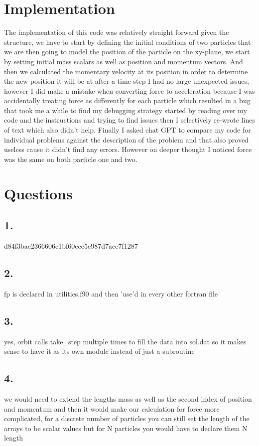 \documentclass{article}
\begin{document}
    \section*{Implementation}
        The implementation of this code was relatively straight forward given the structure, 
        we have to start by defining the initial conditions of two particles that we are then 
        going to model the position of the particle on the xy-plane, we start by setting initial
        mass scalars as well as position and momentum vectors. And then we calculated the momentary
        velocity at its position in order to determine the new position it will be at after a time step
        I had no large unexpected issues, however I did make a mistake when converting force to acceleration
        because I was accidentally treating force as differently for each particle which resulted in a bug that took me a while to find
        my debugging strategy started by reading over my code and the instructions and trying to find issues 
        then I selectively re-wrote lines of text which also didn't help, Finally I asked chat GPT to compare my code
        for individual problems against the description of the problem and that also proved useless cause it didn't find
        any errors. However on deeper thought I noticed force was the same on both particle one and two.
    \section*{Questions}
        \subsection*{1.}
        d84f3bae2366606c1bf60cce5e987d7aee7f1287
        \subsection*{2.}
        fp is declared in utilities.f90 and then 'use'd in every other fortran file
        \subsection*{3.}
        yes, orbit calls take\_step multiple times to fill the data into sol.dat so it makes sense to have it as its own
        module instead of just a subroutine
        \subsection*{4.}
        we would need to extend the lengths mass as well as the second index of position and momentum and then it would make our
        calculation for force more complicated, for a discrete number of particles you can still set the length of the arrays
        to be scalar values but for N particles you would have to declare them N length
\end{document}
